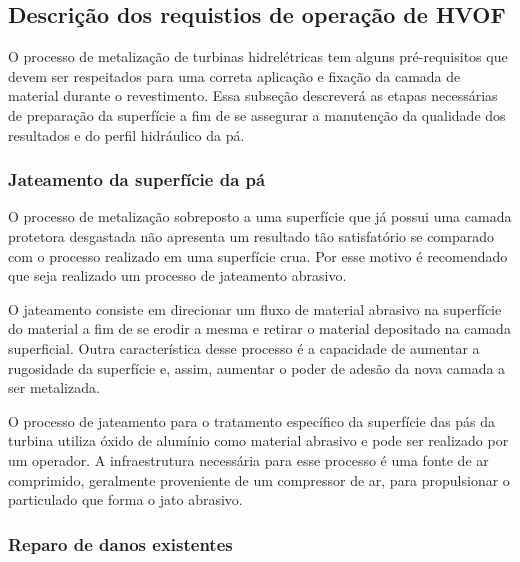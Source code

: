 \subsection{Descrição dos requistios de operação de HVOF}

O processo de metalização de turbinas hidrelétricas tem alguns pré-requisitos
que devem ser respeitados para uma correta aplicação e fixação da camada de
material durante o revestimento. Essa subseção descreverá as etapas necessárias
de preparação da superfície a fim de se assegurar a manutenção da qualidade dos resultados e do
perfil hidráulico da pá. 

\subsubsection{Jateamento da superfície da pá}\label{sec:jat}

O processo de metalização sobreposto a uma superfície que já possui uma camada
protetora desgastada não apresenta um resultado tão satisfatório se comparado
com o processo realizado em uma superfície crua. Por esse motivo é recomendado
que seja realizado um processo de jateamento abrasivo. 

O jateamento consiste em direcionar um fluxo de material abrasivo na superfície
do material a fim de se erodir a mesma e retirar o material depositado na camada
superficial. Outra característica desse processo é a capacidade de aumentar a
rugosidade da superfície e, assim, aumentar o poder de adesão da nova camada a
ser metalizada.  

O processo de jateamento para o tratamento específico da superfície das pás da
turbina utiliza óxido de alumínio como material abrasivo e pode ser realizado
por um operador. A infraestrutura necessária para esse processo é uma fonte de
ar comprimido, geralmente proveniente de um compressor de ar, para propulsionar
o particulado que forma o jato abrasivo. %

\subsubsection{Reparo de danos existentes}

